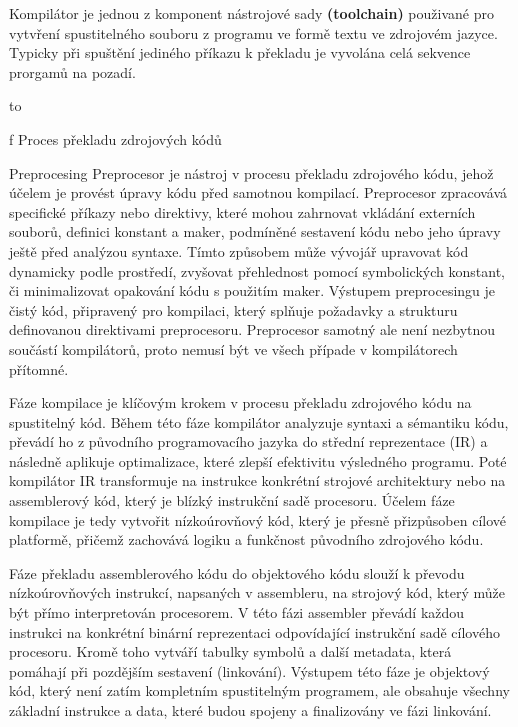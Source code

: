 Kompilátor je jednou z komponent nástrojové sady {\bf (toolchain)} použivané pro vytvření spustitelného souboru z programu ve formě textu ve zdrojovém jazyce. Typicky při spuštění jediného příkazu k překladu je vyvolána celá sekvence prorgamů na pozadí. 

\vskip 5mm 
\hbox to \hsize{\hfil\pdfrefximage\compilerprocessoverview\hfil}
\nobreak\medskip
\caption/f Proces překladu zdrojových kódů

\secc Preprocesing
Preprocesor je nástroj v procesu překladu zdrojového kódu, jehož účelem je provést úpravy kódu před samotnou kompilací. Preprocesor zpracovává specifické příkazy nebo direktivy, které mohou zahrnovat vkládání externích souborů, definici konstant a maker, podmíněné sestavení kódu nebo jeho úpravy ještě před analýzou syntaxe. Tímto způsobem může vývojář upravovat kód dynamicky podle prostředí, zvyšovat přehlednost pomocí symbolických konstant, či minimalizovat opakování kódu s použitím maker. Výstupem preprocesingu je čistý kód, připravený pro kompilaci, který splňuje požadavky a strukturu definovanou direktivami preprocesoru. Preprocesor samotný ale není nezbytnou součástí kompilátorů, proto nemusí být ve všech případe v kompilátorech přítomné.

Fáze kompilace je klíčovým krokem v procesu překladu zdrojového kódu na spustitelný kód. Během této fáze kompilátor analyzuje syntaxi a sémantiku kódu, převádí ho z původního programovacího jazyka do střední reprezentace (IR) a následně aplikuje optimalizace, které zlepší efektivitu výsledného programu. Poté kompilátor IR transformuje na instrukce konkrétní strojové architektury nebo na assemblerový kód, který je blízký instrukční sadě procesoru. Účelem fáze kompilace je tedy vytvořit nízkoúrovňový kód, který je přesně přizpůsoben cílové platformě, přičemž zachovává logiku a funkčnost původního zdrojového kódu.

Fáze překladu assemblerového kódu do objektového kódu slouží k převodu nízkoúrovňových instrukcí, napsaných v assembleru, na strojový kód, který může být přímo interpretován procesorem. V této fázi assembler převádí každou instrukci na konkrétní binární reprezentaci odpovídající instrukční sadě cílového procesoru. Kromě toho vytváří tabulky symbolů a další metadata, která pomáhají při pozdějším sestavení (linkování). Výstupem této fáze je objektový kód, který není zatím kompletním spustitelným programem, ale obsahuje všechny základní instrukce a data, které budou spojeny a finalizovány ve fázi linkování.

